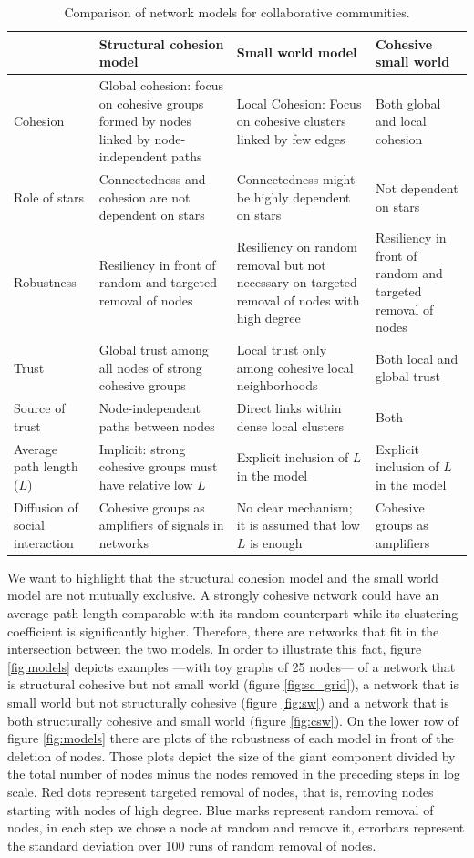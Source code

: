 \begin{table}[h]
\begin{tabular}{|p{2.5cm}|p{4.5cm}|p{4.5cm}|p{4cm}|}
\hline
&Structural cohesion model&Small world model& Cohesive small world\\
\hline
Cohesion&Global cohesion: focus on cohesive groups formed by nodes linked by node-independent paths&Local Cohesion: Focus on cohesive clusters linked by few edges&Both global and local cohesion\\
\hline
Role of stars&Connectedness and cohesion are not dependent on stars&Connectedness might be highly dependent on stars&Not dependent on stars\\
\hline
Robustness&Resiliency in front of random and targeted removal of nodes&Resiliency on random removal but not necessary on targeted removal of nodes with high degree&Resiliency in front of random and targeted removal of nodes\\
\hline
Trust&Global trust among all nodes of strong cohesive groups&Local trust only among cohesive local neighborhoods& Both local and global trust\\
\hline
Source of trust&Node-independent paths between nodes&Direct links within dense local clusters& Both\\
\hline
Average path length ($L$)&Implicit: strong cohesive groups must have relative low $L$&Explicit inclusion of $L$ in the model&Explicit inclusion of $L$ in the model\\
\hline
Diffusion of social interaction&Cohesive groups as amplifiers of signals in networks&No clear mechanism; it is assumed that low $L$ is enough&Cohesive groups as amplifiers\\
\hline
\end{tabular}
\caption{Comparison of network models for collaborative communities.}
\label{t:models}
\end{table}

We want to highlight that the structural cohesion model and the small world model are not mutually exclusive. A strongly cohesive network could have an average path length comparable with its random counterpart while its clustering coefficient is significantly higher. Therefore, there are networks that fit in the intersection between the two models. In order to illustrate this fact, figure \ref{fig:models} depicts examples ---with toy graphs of 25 nodes--- of a network that is structural cohesive but not small world (figure \ref{fig:sc_grid}), a network that is small world but not structurally cohesive (figure \ref{fig:sw}) and a network that is both structurally cohesive and small world (figure \ref{fig:csw}). On the lower row of figure \ref{fig:models} there are plots of the robustness of each model in front of the deletion of nodes. Those plots depict the size of the giant component divided by the total number of nodes minus the nodes removed in the preceding steps in log scale. Red dots represent targeted removal of nodes, that is, removing nodes starting with nodes of high degree. Blue marks represent random removal of nodes, in each step we chose a node at random and remove it, errorbars represent the standard deviation over 100 runs of random removal of nodes.

